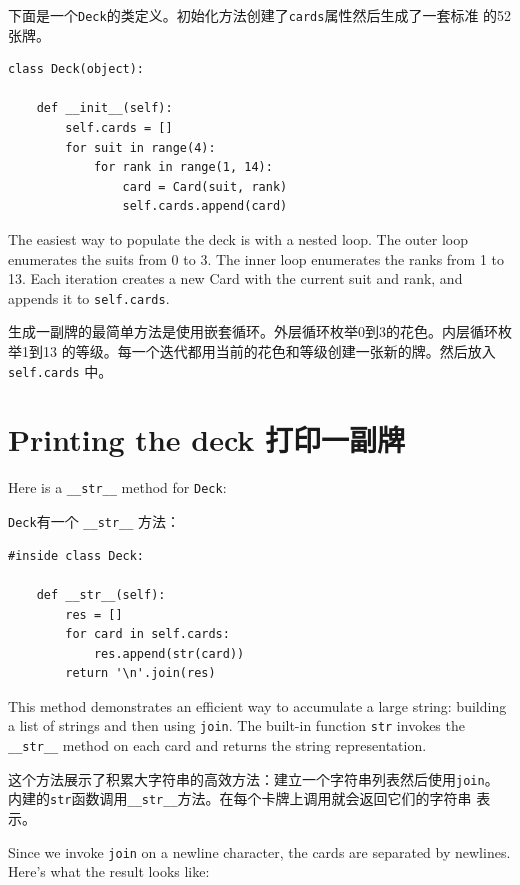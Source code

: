 \documentclass[10pt]{book}
\begin{document}
\begin{CJK}{UTF8}{gbsn}
下面是一个{\tt Deck}的类定义。初始化方法创建了{\tt cards}属性然后生成了一套标准
的52张牌。

\begin{verbatim}
class Deck(object):

    def __init__(self):
        self.cards = []
        for suit in range(4):
            for rank in range(1, 14):
                card = Card(suit, rank)
                self.cards.append(card)
\end{verbatim}
%
The easiest way to populate the deck is with a nested loop.  The outer
loop enumerates the suits from 0 to 3.  The inner loop enumerates the
ranks from 1 to 13.  Each iteration
creates a new Card with the current suit and rank,
and appends it to {\tt self.cards}.

生成一副牌的最简单方法是使用嵌套循环。外层循环枚举0到3的花色。内层循环枚举1到13
的等级。每一个迭代都用当前的花色和等级创建一张新的牌。然后放入{\tt self.cards}
中。


\section{Printing the deck 打印一副牌}
\label{printdeck}

Here is a \verb"__str__" method for {\tt Deck}:

{\tt Deck}有一个 \verb"__str__" 方法：

\begin{verbatim}
#inside class Deck:

    def __str__(self):
        res = []
        for card in self.cards:
            res.append(str(card))
        return '\n'.join(res)
\end{verbatim}
%
This method demonstrates an efficient way to accumulate a large
string: building a list of strings and then using {\tt join}.
The built-in function {\tt str} invokes the \verb"__str__"
method on each card and returns the string representation.

这个方法展示了积累大字符串的高效方法：建立一个字符串列表然后使用{\tt join}。
内建的{\tt str}函数调用\verb"__str__"方法。在每个卡牌上调用就会返回它们的字符串
表示。

Since we invoke {\tt join} on a newline character, the cards
are separated by newlines.  Here's what the result looks like:


\end{CJK}
\end{document}
